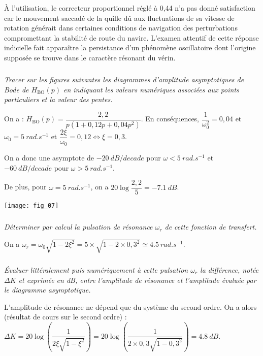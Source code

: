 \begin{multicols}{2}
À l’utilisation, le correcteur proportionnel réglé à 0,44 n’a pas donné satisfaction car le mouvement saccadé
de la quille dû aux fluctuations de sa vitesse de rotation générait dans certaines conditions de navigation des
perturbations compromettant la stabilité de route du navire. L’examen attentif de cette réponse indicielle
fait apparaître la persistance d’un phénomène oscillatoire dont l’origine supposée se trouve dans le
caractère résonant du vérin.

\fi

\subparagraph{}\textit{Tracer sur les figures suivantes les diagrammes d’amplitude asymptotiques de
Bode de $H_{\text{BO}}(p)$ en indiquant les valeurs numériques associées aux
points particuliers et la valeur des pentes.}
\ifprof
\begin{corrige}
On a : $H_{\text{BO}}(p)=\dfrac{2,2}{p\left(1+0,12p + 0,04 p ^2  \right)}$. En conséquences, $\dfrac{1}{\omega_0^2}={0,04}$ et $\omega_0 = \SI{5}{rad.s^{-1}}$ et $\dfrac{2\xi}{\omega_0}=0,12 \Leftrightarrow \xi=0,3$.


On a donc une asymptote de $-\SI{20}{dB/decade}$ pour $\omega<\SI{5}{rad.s^{-1}}$ et $-\SI{60}{dB/decade}$ pour $\omega>\SI{5}{rad.s^{-1}}$.

De plus, pour $\omega=\SI{5}{rad.s^{-1}}$, on a $20\log\dfrac{2,2}{5}=\SI{-7,1}{dB}$. 

\end{corrige}
\else
\fi

\ifprof
\else
\begin{center}
\texttt{[image: fig\_07]}
\end{center}
\fi
\subparagraph{}\textit{Déterminer par calcul la pulsation de résonance $\omega_r$ de cette fonction
de transfert.}
\ifprof
\begin{corrige}
On a $\omega_r = \omega_0\sqrt{1-2\xi^2}=5\times \sqrt{1-2\times 0,3^2}\simeq \SI{4,5}{rad.s^{-1}}$.
\end{corrige}
\else
\fi


\subparagraph{}\textit{Évaluer littéralement puis numériquement à cette pulsation
$\omega_r$ la différence, notée $\Delta K$ et exprimée en dB, entre l’amplitude
de résonance et l’amplitude évaluée par le diagramme asymptotique.}
\ifprof
\begin{corrige}
L'amplitude de résonance ne dépend que du système du second ordre. On a alors (résultat de cours sur le second ordre) : 
$\Delta K = 20\log \left( \dfrac{1}{2\xi \sqrt{1-\xi^2}}\right)=20\log \left( \dfrac{1}{2\times 0,3 \sqrt{1-0,3^2}}\right)=\SI{4,8}{dB}$. 
\end{corrige}
\else
\fi


\end{multicols}
